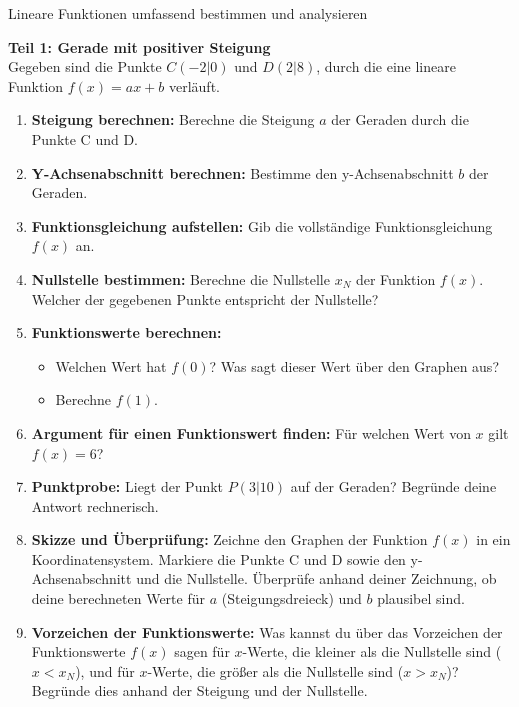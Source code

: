 \begin{aufgabenumgebung}{Lineare Funktionen umfassend bestimmen und analysieren}

\textbf{Teil 1: Gerade mit positiver Steigung} \\
Gegeben sind die Punkte $C(-2|0)$ und $D(2|8)$, durch die eine lineare Funktion $f(x) = ax+b$ verläuft.

\begin{enumerate}[label=(\alph*)]
    \item \textbf{Steigung berechnen:} Berechne die Steigung $a$ der Geraden durch die Punkte C und D.
    \item \textbf{Y-Achsenabschnitt berechnen:} Bestimme den y-Achsenabschnitt $b$ der Geraden.
    \item \textbf{Funktionsgleichung aufstellen:} Gib die vollständige Funktionsgleichung $f(x)$ an.
    \item \textbf{Nullstelle bestimmen:} Berechne die Nullstelle $x_N$ der Funktion $f(x)$. Welcher der gegebenen Punkte entspricht der Nullstelle?
    \item \textbf{Funktionswerte berechnen:}
        \begin{itemize}
            \item Welchen Wert hat $f(0)$? Was sagt dieser Wert über den Graphen aus?
            \item Berechne $f(1)$.
        \end{itemize}
    \item \textbf{Argument für einen Funktionswert finden:} Für welchen Wert von $x$ gilt $f(x) = 6$?
    \item \textbf{Punktprobe:} Liegt der Punkt $P(3|10)$ auf der Geraden? Begründe deine Antwort rechnerisch.
    \item \textbf{Skizze und Überprüfung:} Zeichne den Graphen der Funktion $f(x)$ in ein Koordinatensystem. Markiere die Punkte C und D sowie den y-Achsenabschnitt und die Nullstelle. Überprüfe anhand deiner Zeichnung, ob deine berechneten Werte für $a$ (Steigungsdreieck) und $b$ plausibel sind.
    \item \textbf{Vorzeichen der Funktionswerte:} Was kannst du über das Vorzeichen der Funktionswerte $f(x)$ sagen für $x$-Werte, die kleiner als die Nullstelle sind ($x < x_N$), und für $x$-Werte, die größer als die Nullstelle sind ($x > x_N$)? Begründe dies anhand der Steigung und der Nullstelle.
\end{enumerate}

\bigskip %


\end{aufgabenumgebung}

